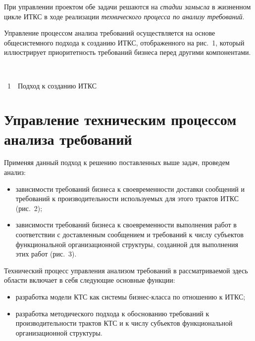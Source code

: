 \begin{multicols}{2}
     При управлении проектом обе задачи решаются на \textit{стадии замысла} в 
жизненном цикле ИТКС в ходе реализации \textit{технического процесса по анализу 
требований}. 

Управление процессом анализа требований осуществляется на основе 
обще\-сис\-тем\-но\-го подхода к созданию ИТКС, отображенного на рис.~1, который 
иллюстрирует приоритетность требований бизнеса перед другими компо\-нен\-тами. 
{ %

}


\begin{center} %
\vspace*{9pt}
\mbox{%
\epsfxsize=62.196mm
}
\end{center}
\begin{center}
{{\figurename~1}\ \ \small{Подход к созданию ИТКС}}
\end{center}





\section{Управление техническим процессом анализа требований}
     
     Применяя данный подход к решению по\-став\-лен\-ных выше задач, проведем анализ: 
     \begin{itemize}
\item зависимости требований бизнеса к своевременности доставки сообщений и 
требований к производительности используемых для этого трактов ИТКС (рис.~2);
\item зависимости требований бизнеса к своевременности выполнения работ в 
соответствии с доставленным сообщением и требований к числу субъектов 
функциональной организационной структуры, созданной для выполнения этих работ 
(рис.~3).
\end{itemize}



     Технический процесс управления анализом требований в рассматриваемой здесь 
области включает в себя следующие основные функции:
     \begin{itemize}
\item разработка модели КТС как сис\-те\-мы биз\-нес-клас\-са по отношению к ИТКС;
\item разработка методического подхода к обоснованию требований к производительности 
трактов КТС и к числу субъектов функциональной организационной структуры.
     \end{itemize}
     

\end{multicols}
